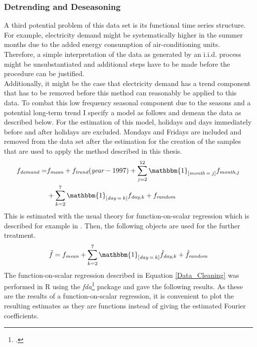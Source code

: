 \documentclass[12pt, a4paper]{article}
\theoremstyle{MAstyle} \newtheorem{assumption}{Assumption}[section]
\theoremstyle{MAstyle} \newtheorem{definition}{Definition}[section]
\theoremstyle{MAstyle} \newtheorem{theorem}{Theorem}[section]
\begin{document}
			\subsubsection{Detrending and Deseasoning}
			A third potential problem of this data set is its functional time series structure. For example, electricity demand might be systematically higher in the summer months due to the added energy consumption of air-conditioning units. Therefore, a simple interpretation of the data as generated by an i.i.d. process might be unsubstantiated and additional steps have to be made before the procedure can be justified. \\
			Additionally, it might be the case that electricity demand has a trend component that has to be removed before this method can reasonably be applied to this data. To combat this low frequency seasonal component due to the seasons and a potential long-term trend I specify a model as follows and demean the data as described below. For the estimation of this model, holidays and days immediately before and after holidays are excluded. Mondays and Fridays are included and removed from the data set after the estimation for the creation of the samples that are used to apply the method described in this thesis.
			\begin{equation}\label{Data_Cleaning}
				\begin{split}
					f_{\textit{demand}} = &f_{\textit{mean}} + f_{\textit{trend}}(\textit{year} - 1997) + \sum_{j = 2}^{12}\mathbbm{1}_{\left[\textit{month}\: = \: j\right]}f_{\textit{month}, j}\\
					 &+ \sum_{k = 2}^{7}\mathbbm{1}_{\left[\textit{day}\: = \: k\right]}f_{\textit{day}, k} + f_{\textit{random}}
				\end{split}	
			\end{equation}
			This is estimated with the usual theory for function-on-scalar regression which is described for example in \cite{ramsay_functional_2005}. Then, the following objects are used for the further treatment.
			\begin{equation}
				\tilde{f} = f_{\textit{mean}} + \sum_{k = 2}^{7}\mathbbm{1}_{\left[\textit{day}\: = \: k\right]}\hat{f}_{\textit{day}, k} + \hat{f}_{\textit{random}}
			\end{equation}
			The function-on-scalar regression described in Equation \ref{Data_Cleaning} was performed in R using the \textit{fda}\footcite{fda} package and gave the following results. As these are the results of a function-on-scalar regression, it is convenient to plot the resulting estimates as they are functions instead of giving the estimated Fourier coefficients.
\end{document}
